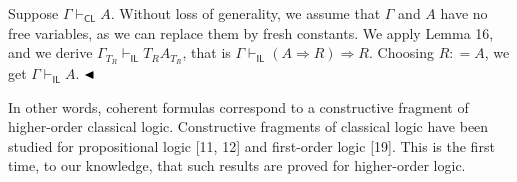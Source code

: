 Suppose $\Gamma\vdash_{\mathsf{CL}}A$. Without loss of generality, we assume that $\Gamma$ and $A$ have no free variables, as we can replace them by fresh constants. We apply Lemma 16, and we derive $\Gamma_{T_{R}}\vdash_{\mathsf{IL}}T_{R}A_{T_{R}}$, that is $\Gamma\vdash_{\mathsf{IL}}(A\mathbin{\Rightarrow}R)\mathbin{\Rightarrow}R$. Choosing $R\mathrel{\mathop{:}}=A$, we get $\Gamma\vdash_{\mathsf{IL}}A$. $\hfill\blacktriangleleft$\par
 
 
 
In other words, coherent formulas correspond to a constructive fragment of higher-order classical logic. Constructive fragments of classical logic have been studied for propositional logic [11, 12] and first-order logic [19]. This is the first time, to our knowledge, that such results are proved for higher-order logic.\par
 
 
 
